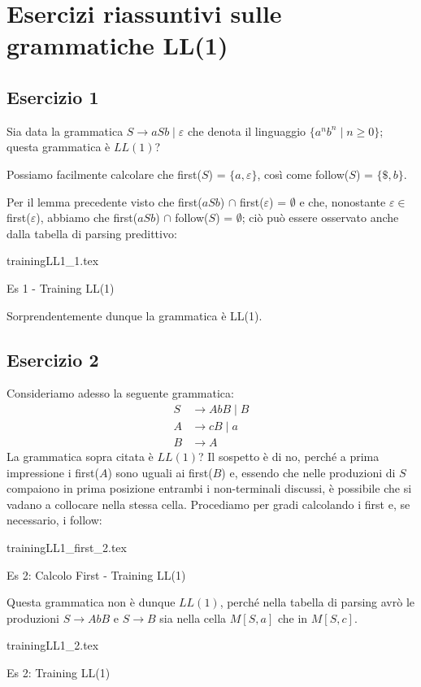 \documentclass[class=book, crop=false, oneside, 12pt]{standalone}
\begin{document}
\section{Esercizi riassuntivi sulle grammatiche LL(1)}
\subsection*{Esercizio 1}
Sia data la grammatica \(S \rightarrow aSb \mid \varepsilon\) che denota il linguaggio \(\{a^n b^n \mid n \geq 0\}\); questa grammatica è \(LL(1)\)?

Possiamo facilmente calcolare che first(\(S\)) = \(\{a, \varepsilon\}\), così come follow(\(S\)) = \(\{\$, b\}\). 

Per il lemma precedente visto che first(\(aSb\)) \(\cap\) first(\(\varepsilon\)) = \(\emptyset\) e che, nonostante \(\varepsilon \in\) first(\(\varepsilon\)), abbiamo che first(\(aSb\)) \(\cap\) follow(\(S\)) = \(\emptyset\); ciò può essere osservato anche dalla tabella di parsing predittivo:
\begin{table}[h]
    \centering
    {trainingLL1_1.tex}
    \caption{Es 1 - Training LL(1)}
    \label{trainingLL1_1}
\end{table}
Sorprendentemente dunque la grammatica è LL(1).

\subsection*{Esercizio 2}
Consideriamo adesso la seguente grammatica:
\begin{align*}
    S &\rightarrow AbB \mid B \\
    A &\rightarrow cB \mid a \\
    B &\rightarrow A
\end{align*}
La grammatica sopra citata è \(LL(1)\)? Il sospetto è di no, perché a prima impressione i first(\(A\)) sono uguali ai first(\(B\)) e, essendo che nelle produzioni di \(S\) compaiono in prima posizione entrambi i non-terminali discussi, è possibile che si vadano a collocare nella stessa cella. Procediamo per gradi calcolando i first e, se necessario, i follow:
\begin{table}[h]
    \centering
    {trainingLL1_first_2.tex}
    \caption{Es 2: Calcolo First - Training LL(1)}
    \label{trainingLL1_first_2}
\end{table}
Questa grammatica non è dunque \(LL(1)\), perché nella tabella di parsing avrò le produzioni \(S \rightarrow AbB\) e \(S \rightarrow B\) sia nella cella \(M[S, a]\) che in \(M[S, c]\).
\begin{table}[h]
    \centering
    {trainingLL1_2.tex}
    \caption{Es 2: Training LL(1)}
    \label{trainingLL1_2}
\end{table}
\end{document}
